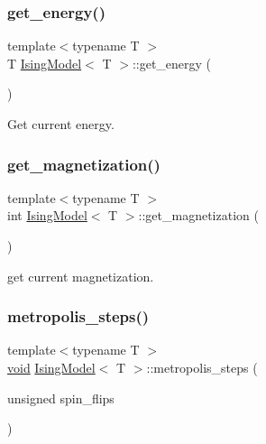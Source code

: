 \subsubsection{\texorpdfstring{get\+\_\+energy()}{get\_energy()}}
{\footnotesize\ttfamily template$<$typename T $>$ \\
T \mbox{\hyperlink{classIsingModel}{Ising\+Model}}$<$ T $>$\+::get\+\_\+energy (\begin{DoxyParamCaption}{ }\end{DoxyParamCaption})\hspace{0.3cm}{\ttfamily [inline]}}



Get current energy. 

\mbox{\label{classIsingModel_a58c9ebc61c0b2238fd52b62df8ce4853}} 
\subsubsection{\texorpdfstring{get\+\_\+magnetization()}{get\_magnetization()}}
{\footnotesize\ttfamily template$<$typename T $>$ \\
int \mbox{\hyperlink{classIsingModel}{Ising\+Model}}$<$ T $>$\+::get\+\_\+magnetization (\begin{DoxyParamCaption}{ }\end{DoxyParamCaption})\hspace{0.3cm}{\ttfamily [inline]}}



get current magnetization. 

\mbox{\label{classIsingModel_a195316f577d71297e9634fa6fdeacc44}} 
\subsubsection{\texorpdfstring{metropolis\+\_\+steps()}{metropolis\_steps()}}
{\footnotesize\ttfamily template$<$typename T $>$ \\
\mbox{\hyperlink{glad_8h_a950fc91edb4504f62f1c577bf4727c29}{void}} \mbox{\hyperlink{classIsingModel}{Ising\+Model}}$<$ T $>$\+::metropolis\+\_\+steps (\begin{DoxyParamCaption}\item[{unsigned}]{spin\+\_\+flips }\end{DoxyParamCaption})\hspace{0.3cm}{\ttfamily [inline]}}



